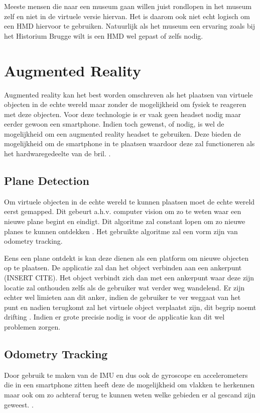 Meeste mensen die naar een museum gaan willen juist rondlopen in het museum zelf en niet in de virtuele versie hiervan. Het is daarom ook niet echt logisch om een HMD hiervoor te gebruiken. Natuurlijk als het museum een ervaring zoals bij het Historium Brugge wilt is een HMD wel gepast of zelfs nodig.

\section{Augmented Reality} \label{sec:augmentedreality}
Augmented reality kan het best worden omschreven als het plaatsen van virtuele objecten in de echte wereld maar zonder de mogelijkheid om fysiek te reageren met deze objecten. Voor deze technologie is er vaak geen headset nodig maar eerder gewoon een smartphone. Indien toch gewenst, of nodig, is wel de mogelijkheid om een augmented reality headset te gebruiken. Deze bieden de mogelijkheid om de smartphone in te plaatsen waardoor deze zal functioneren als het hardwaregedeelte van de bril. \autocite{Schops2014}.

\subsection{Plane Detection}
Om virtuele objecten in de echte wereld te kunnen plaatsen moet de echte wereld eerst gemapped. Dit gebeurt a.h.v. computer vision om zo te weten waar een nieuwe plane begint en eindigt. Dit algoritme zal constant lopen om zo nieuwe planes te kunnen ontdekken \autocite{Xu2018}. Het gebruikte algoritme zal een vorm zijn van odometry tracking.

Eens een plane ontdekt is kan deze dienen als een platform om nieuwe objecten op te plaatsen. De applicatie zal dan het object verbinden aan een ankerpunt (INSERT CITE). Het object verbindt zich dan met een ankerpunt waar deze zijn locatie zal onthouden zelfs als de gebruiker wat verder weg wandelend. Er zijn echter wel limieten aan dit anker, indien de gebruiker te ver weggaat van het punt en nadien terugkomt zal het virtuele object verplaatst zijn, dit begrip noemt drifting \autocite{You1999}. Indien er grote precisie nodig is voor de applicatie kan dit wel problemen zorgen.

\subsection{Odometry Tracking}

Door gebruik te maken van de IMU en dus ook de gyroscope en accelerometers die in een smartphone zitten heeft deze de mogelijkheid om vlakken te herkennen maar ook om zo achteraf terug te kunnen weten welke gebieden er al gescand zijn geweest. \autocite{Leutenegger2015}.

